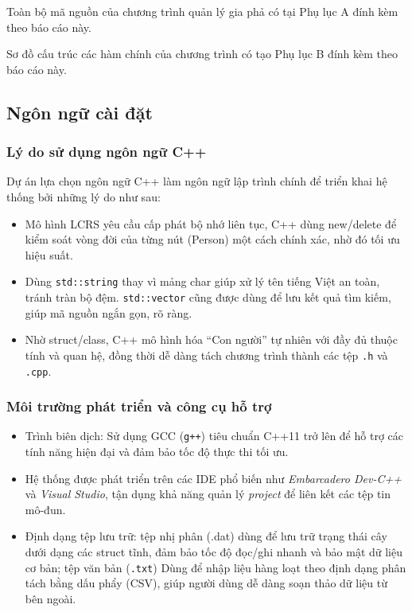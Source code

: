 

Toàn bộ mã nguồn của chương trình quản lý gia phả có tại Phụ lục A đính kèm theo báo cáo này.

Sơ đồ cấu trúc các hàm chính của chương trình có tạo Phụ lục B đính kèm theo báo cáo này.

\subsection{Ngôn ngữ cài đặt}

\subsubsection{Lý do sử dụng ngôn ngữ C++}
Dự án lựa chọn ngôn ngữ C++ làm ngôn ngữ lập trình chính để triển khai hệ thống bởi những lý do như sau:
\begin{itemize}
	\item Mô hình LCRS yêu cầu cấp phát bộ nhớ liên tục, C++ dùng new/delete để kiểm soát vòng đời của từng nút (Person) một cách chính xác, nhờ đó tối ưu hiệu suất.
	\item Dùng \texttt{std::string} thay vì mảng char giúp xử lý tên tiếng Việt an toàn, tránh tràn bộ đệm. \texttt{std::vector} cũng được dùng để lưu kết quả tìm kiếm, giúp mã nguồn ngắn gọn, rõ ràng.
	\item Nhờ struct/class, C++ mô hình hóa “Con người” tự nhiên với đầy đủ thuộc tính và quan hệ, đồng thời dễ dàng tách chương trình thành các tệp \texttt{.h} và \texttt{.cpp}.
\end{itemize}

\subsubsection{Môi trường phát triển và công cụ hỗ trợ}
\begin{itemize}
	\item Trình biên dịch: Sử dụng GCC (\texttt{g++}) tiêu chuẩn C++11 trở lên để hỗ trợ các tính năng hiện đại và đảm bảo tốc độ thực thi tối ưu.
	\item Hệ thống được phát triển trên các IDE phổ biến như \textit{Embarcadero Dev-C++} và \textit{Visual Studio}, tận dụng khả năng quản lý \textit{project} để liên kết các tệp tin mô-đun.
	\item Định dạng tệp lưu trữ: tệp nhị phân (.dat) dùng để lưu trữ trạng thái cây dưới dạng các struct tĩnh, đảm bảo tốc độ đọc/ghi nhanh và bảo mật dữ liệu cơ bản; tệp văn bản (\texttt{.txt}) Dùng để nhập liệu hàng loạt theo định dạng phân tách bằng dấu phẩy (CSV), giúp người dùng dễ dàng soạn thảo dữ liệu từ bên ngoài.
\end{itemize}

